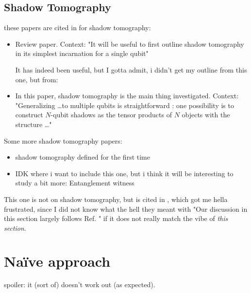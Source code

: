 \subsection{Shadow Tomography}
these papers are cited in
\cite{garrattProbingPostmeasurementEntanglement2023} for shadow tomography:
\begin{itemize}
  \item {}
    \cite{elbenRandomizedMeasurementToolbox2022}

    Review paper. Context: "It will be useful to first outline shadow
    tomography \cite{elbenRandomizedMeasurementToolbox2022} in its simplest
    incarnation for a single qubit"

    It has indeed been useful, but I gotta admit, i didn't get my outline from
    this one, but from:
  \item {}
    \cite{huangPredictingManyProperties2020} 

    In this paper, shadow tomography is the main thing investigated. Context:
    "Generalizing \ldots to multiple qubits is straightforward
    \cite{huangPredictingManyProperties2020}: one possibility is to construct
    $N$-qubit shadows as the tensor products of $N$ objects with the structure
    \ldots"
\end{itemize}

Some more shadow tomography papers:
\begin{itemize}
  \item \cite{aaronsonShadowTomographyQuantum2018} shadow tomography defined
    for the first time
  \item IDK where i want to include this one, but i think it will be
    interesting to study a bit more:
    \cite{tothEntanglementDetectionStabilizer2005} Entanglement witness
\end{itemize}

This one is not on shadow tomography, but is cited in
\cite{garrattProbingPostmeasurementEntanglement2023}, which got me hella
frustrated, since I did not know what the hell they meant with "Our discussion
in this section largely follows Ref.
\cite{garrattMeasurementsConspireNonlocally2023}" if it does not really match
the vibe of \emph{this section}.

\section{Na\"ive approach}
spoiler: it (sort of) doesn't work out (as expected).

